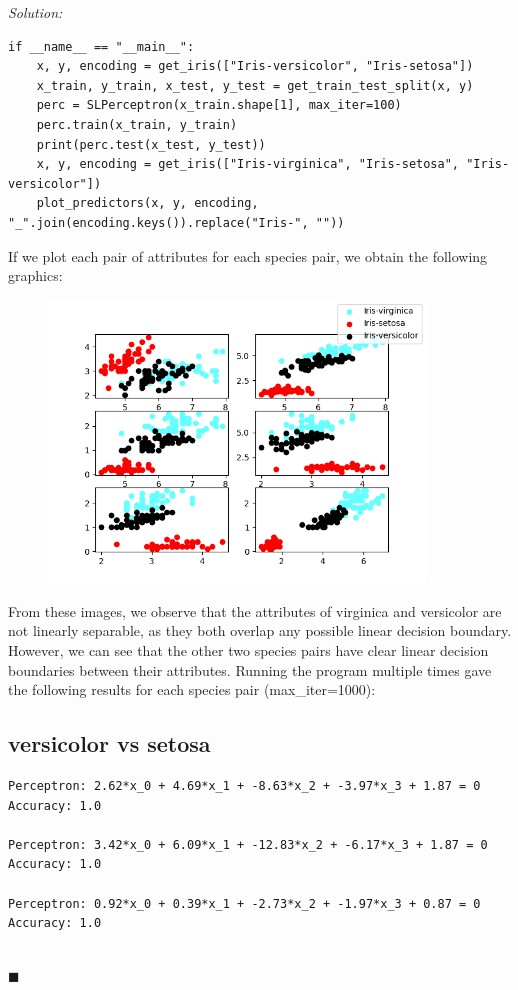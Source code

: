 \documentclass{article}
\newenvironment{solution}
    {\textit{Solution:}\\}
    {$\blacksquare$}
\begin{document}
\begin{solution}
\begin{verbatim}
if __name__ == "__main__":
    x, y, encoding = get_iris(["Iris-versicolor", "Iris-setosa"])
    x_train, y_train, x_test, y_test = get_train_test_split(x, y)
    perc = SLPerceptron(x_train.shape[1], max_iter=100)
    perc.train(x_train, y_train)
    print(perc.test(x_test, y_test))
    x, y, encoding = get_iris(["Iris-virginica", "Iris-setosa", "Iris-versicolor"])
    plot_predictors(x, y, encoding, "_".join(encoding.keys()).replace("Iris-", ""))
\end{verbatim}

\newpage
If we plot each pair of attributes for each species 
pair, we obtain the following graphics:
\begin{figure}[h!]
\centering
\includegraphics[width=10cm]{virginica_setosa_versicolor.png}
\end{figure}

From these images, we observe that the attributes of virginica
and versicolor are not linearly separable, as they both overlap 
any possible linear decision boundary. However, we can see that 
the other two species pairs have clear linear decision boundaries
between their attributes. Running the program multiple times
gave the following results for each species pair (max\_iter=1000):
\subsection*{versicolor vs setosa}
\begin{verbatim}
Perceptron: 2.62*x_0 + 4.69*x_1 + -8.63*x_2 + -3.97*x_3 + 1.87 = 0
Accuracy: 1.0

Perceptron: 3.42*x_0 + 6.09*x_1 + -12.83*x_2 + -6.17*x_3 + 1.87 = 0
Accuracy: 1.0

Perceptron: 0.92*x_0 + 0.39*x_1 + -2.73*x_2 + -1.97*x_3 + 0.87 = 0
Accuracy: 1.0


\end{verbatim}
\end{solution}
\end{document}
